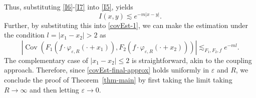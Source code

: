 \documentclass{article}
\newcommand{\tmop}[1]{\ensuremath{\operatorname{#1}}}
\begin{document}
%
Thus, substituting \eqref{I6}-\eqref{I7} into  \eqref{I5}, yields
%
\[ 
     I (x, y) \lesssim e^{- m | x - y |}.
   \]
Further, by substituting this into \eqref{covEst-1}, we  can make the estimation under the condition $l = | x_1 - x_2 | > 2$ as
%
\begin{equation}
    | \tmop{Cov} (F_1 (f \cdot \varphi_{\varepsilon, R} (\cdot + x_1)), F_2
    (f \cdot \varphi_{\varepsilon, R} (\cdot + x_2))) | \lesssim_{F_1, F_2,
    f}  e^{- m l} .
  \label{covEst-final-approx}
\end{equation}
%
The complementary case of $| x_1 - x_2 | \leqslant 2$ is  straightforward, akin to the coupling approach.  
%
Therefore, since \eqref{covEst-final-approx}  holds uniformly in $\varepsilon$ and $R$, we conclude the proof of Theorem~\ref{thm-main} by first taking the limit taking $R \rightarrow \infty$ and then letting $\varepsilon \rightarrow 0$.
\end{document}
